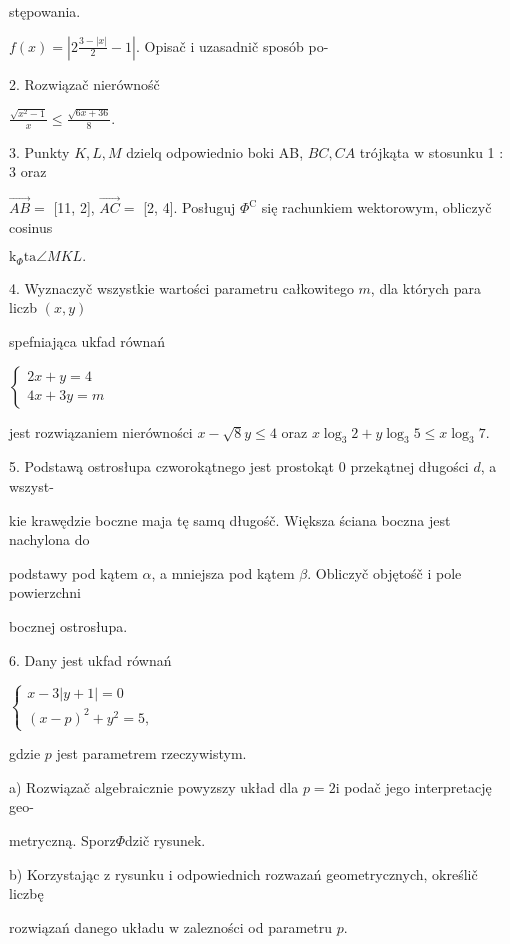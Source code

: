 \documentclass[a4paper,12pt]{article}
\begin{document}
stępowania.

$f(x)= |2\displaystyle \frac{3-|x|}{2}-1|$. Opisač $\mathrm{i}$ uzasadnič sposób po-

2. Rozwiązač nierównośč

$\displaystyle \frac{\sqrt{x^{2}-1}}{x}\leq\frac{\sqrt{6x+36}}{8}.$

3. Punkty $K, L, M$ dzielq odpowiednio boki AB, $BC, CA$ trójkąta $\mathrm{w}$ stosunku 1 : 3 oraz

$\vec{AB} =$ [11, 2], $\vec{AC} =$ [2, 4]. Posługuj $\Phi^{\mathrm{C}}$ się rachunkiem wektorowym, obliczyč cosinus

$\mathrm{k}_{\Phi}\mathrm{t}\mathrm{a}\angle MKL.$

4. Wyznaczyč wszystkie wartości parametru całkowitego $m$, dla których para liczb $(x,y)$

spefniająca ukfad równań

$\left\{\begin{array}{l}
2x+y=4\\
4x+3y=m
\end{array}\right.$

jest rozwiązaniem nierówności $x-\sqrt{8}y\leq 4$ oraz $x\log_{3}2+y\log_{3}5\leq x\log_{3}7.$

5. Podstawą ostrosłupa czworokątnego jest prostokąt $0$ przekątnej długości $d$, a wszyst-

kie krawędzie boczne maja tę samq długośč. Większa ściana boczna jest nachylona do

podstawy pod kątem $\alpha$, a mniejsza pod kątem $\beta$. Obliczyč objętośč $\mathrm{i}$ pole powierzchni

bocznej ostrosłupa.

6. Dany jest ukfad równań

$\left\{\begin{array}{l}
x-3|y+1|=0\\
(x-p)^{2}+y^{2}=5,
\end{array}\right.$

gdzie $p$ jest parametrem rzeczywistym.

a) Rozwiązač algebraicznie powyzszy układ dla $p=2\mathrm{i}$ podač jego interpretację geo-

metryczną. Sporz$\Phi$dzič rysunek.

b) Korzystając $\mathrm{z}$ rysunku $\mathrm{i}$ odpowiednich rozwazań geometrycznych, określič liczbę

rozwiązań danego układu $\mathrm{w}$ zalezności od parametru $p.$
\end{document}
